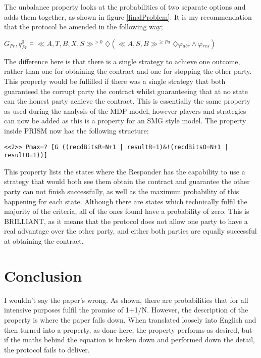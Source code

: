 \documentclass{l4proj}
\begin{document}
The unbalance property looks at the probabilities of two separate options and adds them together, as shown in figure \ref{finalProblem}. It is my recommendation that the protocol be amended in the following way;

$ G{_{Pr}},q_{Pr}^{0}\models  \ll A, T, B, X, S \gg ^{>0} \diamondsuit (\ll A, S, B \gg^{\ge Pa} \diamondsuit \varphi{_{abr}} \wedge \varphi{_{res}}) $

The difference here is that there is a single strategy to achieve one outcome, rather than one for obtaining the contract and one for stopping the other party. This property would be fulfilled if there was a single strategy that both guaranteed the corrupt party the contract whilst guaranteeing that at no state can the honest party achieve the contract. This is essentially the same property as used during the analysis of the MDP model, however players and strategies can now be added as this is a property for an SMG style model. The property inside PRISM now has the following structure:
\begin{lstlisting}
<<2>> Pmax=? [G ((recdBitsR=N+1 | resultR=1)&!(recdBitsO=N+1 | resultO=1))]
\end{lstlisting}

This property lists the states where the Responder has the capability to use a strategy that would both see them obtain the contract and guarantee the other party can not finish successfully, as well as the maximum probability of this happening for each state. Although there are states which technically fulfil the majority of the criteria, all of the ones found have a probability of zero. This is BRILLIANT, as it means that the protocol does not allow one party to have a real advantage over the other party, and either both parties are equally successful at obtaining the contract. 



\chapter{Conclusion}
I wouldn't say the paper's wrong. As shown, there are probabilities that for all intensive purposes fulfil the promise of 1+1/N. However, the description of the property is where the paper falls down. When translated loosely into English and then turned into a property, as done here, the property performs as desired, but if the maths behind the equation is broken down and performed down the detail, the protocol fails to deliver.
\end{document}
